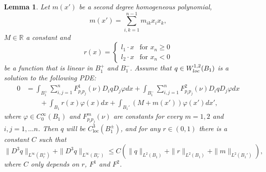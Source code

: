\documentclass[10pt,a4paper]{amsart}
\newtheorem{lem}{Lemma}
\newcommand{\R}{\mathbb{R}}
\newcommand{\loc}{\mathrm{loc}}
\begin{document}
\begin{lem}\label{cor:C3result}
 Let $m(x')$ be a second degree homogeneous polynomial, 
 $$
 m(x')= \sum_{i,k=1}^{n-1}m_{ik} x_i x_k,
 $$
 $M \in \R$ a constant and
 $$
 r(x)=\left\{ \begin{array}{ll}
               l_1\cdot x & \textrm{for }x_n\ge 0 \\
               l_2\cdot x & \textrm{for }x_n<0
              \end{array}
 \right.
 $$
 be a function that is linear in $B_1^+$ and $B_1^-$.
Assume that $q\in W^{1,2}_{\textup{loc}}(B_{1})$ is a solution to the following PDE:
 \begin{align}\label{eq:lin_pde_withmr}
 0 &= \int_{B_{1}^+}\sum_{i,j=1}^{n}F^1_{p_ip_j}(\nu) D_i qD_j\varphi dx+
 \int_{B_{1}^-}\sum_{i,j=1}^{n}F^2_{p_ip_j}(\nu) D_i qD_j\varphi dx \\
 & \qquad +\int_{B_1}r(x)\varphi(x) dx +\int_{B_1'}(M+m(x'))\varphi(x') dx', \nonumber
 \end{align}
 where $\varphi \in C^{\infty}_0(B_{1})$ and $F^m_{p_i p_j}(\nu)$ are constants for every $m=1,2$ and $i,j=1, \hdots n$. Then $q$ will be $C^3_{\loc}(B_1^{\pm})$, and for any $r \in (0,1)$ there is a
 constant $C$ such that
 $$
 \|D^3 q\|_{L^{\infty}(B^+_{r})}+\|D^3 q\|_{L^{\infty}(B^-_{r})}\leq C \left( \|q\|_{L^2(B_1)}+ \|r\|_{L^2(B_1)}+ \|m\|_{L^2(B_1')}\right),
 $$
 where $C$ only depends on $r$, $F^1$ and $F^2$.
\end{lem}
\end{document}
